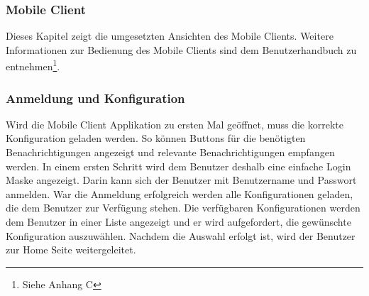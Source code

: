 \subsubsection{Mobile Client}\label{subsec:mobile-client-realisation}

Dieses Kapitel zeigt die umgesetzten Ansichten des Mobile Clients.
Weitere Informationen zur Bedienung des Mobile Clients sind dem Benutzerhandbuch zu entnehmen\footnote{Siehe Anhang C}.

\subsubsection*{Anmeldung und Konfiguration}

Wird die Mobile Client Applikation zu ersten Mal geöffnet, muss die korrekte Konfiguration geladen werden.
So können Buttons für die benötigten Benachrichtigungen angezeigt und relevante Benachrichtigungen empfangen werden.
In einem ersten Schritt wird dem Benutzer deshalb eine einfache Login Maske angezeigt.
Darin kann sich der Benutzer mit Benutzername und Passwort anmelden.
War die Anmeldung erfolgreich werden alle Konfigurationen geladen, die dem Benutzer zur Verfügung stehen.
Die verfügbaren Konfigurationen werden dem Benutzer in einer Liste angezeigt und er wird aufgefordert, die gewünschte Konfiguration auszuwählen.
Nachdem die Auswahl erfolgt ist, wird der Benutzer zur Home Seite weitergeleitet.

